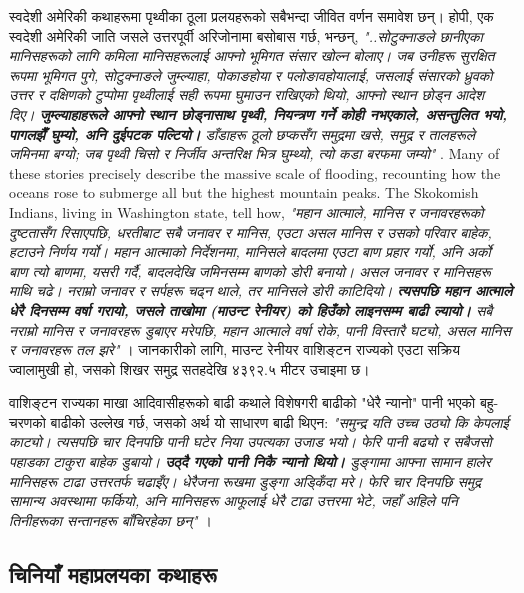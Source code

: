 \documentclass[10pt,twocolumn,letterpaper]{article}
\begin{document}
स्वदेशी अमेरिकी कथाहरूमा पृथ्वीका ठूला प्रलयहरूको सबैभन्दा जीवित वर्णन समावेश छन्। होपी, एक स्वदेशी अमेरिकी जाति जसले उत्तरपूर्वी अरिजोनामा बसोबास गर्छ, भन्छन्, \textit{"..सोटुक्नाङले छानीएका मानिसहरूको लागि कमिला मानिसहरूलाई आफ्नो भूमिगत संसार खोल्न बोलाए। जब उनीहरू सुरक्षित रूपमा भूमिगत पुगे, सोटुक्नाङले जुम्ल्याहा, पोकाङहोया र पलोङावहोयालाई, जसलाई संसारको ध्रुवको उत्तर र दक्षिणको टुप्पोमा पृथ्वीलाई सही रूपमा घुमाउन राखिएको थियो, आफ्नो स्थान छोड्न आदेश दिए। \textbf{जुम्ल्याहाहरूले आफ्नो स्थान छोड्नासाथ पृथ्वी, नियन्त्रण गर्ने कोही नभएकाले, असन्तुलित भयो, पागलझैँ घुम्यो, अनि दुईपटक पल्टियो।} डाँडाहरू ठूलो छप्कसँग समुद्रमा खसे, समुद्र र तालहरूले जमिनमा बग्यो; जब पृथ्वी चिसो र निर्जीव अन्तरिक्ष भित्र घुम्थ्यो, त्यो कडा बरफमा जम्यो"} \cite{4}.
Many of these stories precisely describe the massive scale of flooding, recounting how the oceans rose to submerge all but the highest mountain peaks. The Skokomish Indians, living in Washington state, tell how, \textit{"महान आत्माले, मानिस र जनावरहरूको दुष्टतासँग रिसाएपछि, धरतीबाट सबै जनावर र मानिस, एउटा असल मानिस र उसको परिवार बाहेक, हटाउने निर्णय गर्यो। महान आत्माको निर्देशनमा, मानिसले बादलमा एउटा बाण प्रहार गर्यो, अनि अर्को बाण त्यो बाणमा, यसरी गर्दै, बादलदेखि जमिनसम्म बाणको डोरी बनायो। असल जनावर र मानिसहरू माथि चढे। नराम्रो जनावर र सर्पहरू चढ्न थाले, तर मानिसले डोरी काटिदियो। \textbf{त्यसपछि महान आत्माले धेरै दिनसम्म वर्षा गरायो, जसले ताखोमा (माउन्ट रेनीयर) को हिउँको लाइनसम्म बाढी ल्यायो।} सबै नराम्रो मानिस र जनावरहरू डुबाएर मरेपछि, महान आत्माले वर्षा रोके, पानी विस्तारै घट्यो, असल मानिस र जनावरहरू तल झरे"} \cite{3}। जानकारीको लागि, माउन्ट रेनीयर वाशिङ्टन राज्यको एउटा सक्रिय ज्वालामुखी हो, जसको शिखर समुद्र सतहदेखि ४३९२.५ मीटर उचाइमा छ।

वाशिङ्टन राज्यका माखा आदिवासीहरूको बाढी कथाले विशेषगरी बाढीको "धेरै न्यानो" पानी भएको बहु-चरणको बाढीको उल्लेख गर्छ, जसको अर्थ यो साधारण बाढी थिएन: \textit{"समुन्द्र यति उच्च उठ्यो कि केपलाई काट्यो। त्यसपछि चार दिनपछि पानी घटेर निया उपत्यका उजाड भयो। फेरि पानी बढ्यो र सबैजसो पहाडका टाकुरा बाहेक डुबायो। \textbf{उठ्दै गएको पानी निकै न्यानो थियो।} डुङ्गामा आफ्ना सामान हालेर मानिसहरू टाढा उत्तरतर्फ चढाइँए। धेरैजना रूखमा डुङ्गा अड्किँदा मरे। फेरि चार दिनपछि समुद्र सामान्य अवस्थामा फर्कियो, अनि मानिसहरू आफूलाई धेरै टाढा उत्तरमा भेटे, जहाँ अहिले पनि तिनीहरूका सन्तानहरू बाँचिरहेका छन्"} \cite{3}।

\subsection{चिनियाँ महाप्रलयका कथाहरू}
\end{document}

